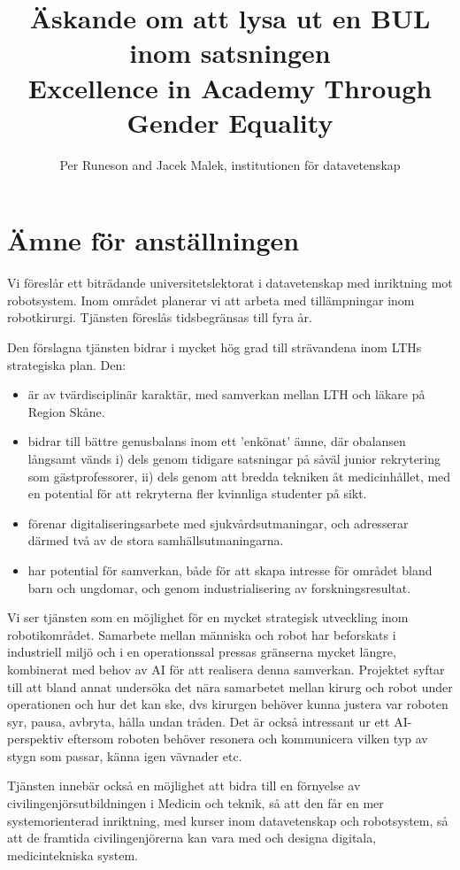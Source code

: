 \documentclass[11pt,a4paper]{article}
\title{Äskande om att lysa ut en BUL inom satsningen\\Excellence in Academy Through Gender Equality }
\author{Per Runeson and Jacek Malek, institutionen för  datavetenskap}
\begin{document}
\maketitle
\section{Ämne för anställningen}
Vi föreslår ett biträdande universitetslektorat i datavetenskap med inriktning mot robotsystem. Inom området planerar vi att arbeta med tillämpningar inom robotkirurgi. Tjänsten föreslås tidsbegränsas till fyra år. 

Den förslagna tjänsten bidrar i mycket hög grad till strävandena inom LTHs strategiska plan. Den:
\begin{itemize}
\item är av tvärdisciplinär karaktär, med samverkan mellan LTH och läkare på Region Skåne.
\item bidrar till bättre genusbalans inom ett ’enkönat' ämne, där obalansen långsamt vänds i) dels genom tidigare satsningar på såväl junior rekrytering som gästprofessorer, ii) dels genom att bredda tekniken åt medicinhållet, med en potential för att rekryterna fler kvinnliga studenter på sikt.
\item förenar digitaliseringsarbete med sjukvårdsutmaningar, och adresserar därmed två av de stora samhällsutmaningarna. 
\item har potential för samverkan, både för att skapa intresse för området bland barn och ungdomar, och genom industrialisering av forskningsresultat.
\end{itemize}

Vi ser tjänsten som en möjlighet för en mycket strategisk utveckling inom robotikområdet. Samarbete mellan människa och robot har beforskats i industriell miljö och i en operationssal pressas gränserna mycket längre, kombinerat med behov av AI för att realisera denna samverkan. Projektet syftar till att bland annat  undersöka det nära samarbetet mellan kirurg och robot under operationen och hur det kan ske, dvs kirurgen behöver kunna justera var roboten syr, pausa, avbryta, hålla undan tråden. Det är också intressant ur ett AI-perspektiv eftersom roboten behöver resonera och kommunicera vilken typ av stygn som passar, känna igen vävnader etc.

Tjänsten innebär också en möjlighet att bidra till en förnyelse av civilingenjörsutbildningen i Medicin och teknik, så att den får en mer systemorienterad inriktning, med kurser inom datavetenskap och robotsystem, så att de framtida civilingenjörerna kan vara med och designa digitala, medicintekniska system.
\end{document}
